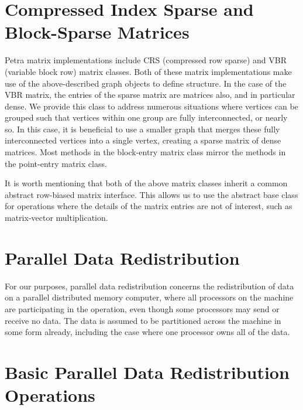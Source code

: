 \documentclass[12pt,relax]{PetraObjectModel}
\begin{document}
\section{Compressed Index Sparse and Block-Sparse Matrices}
Petra matrix implementations include CRS (compressed row sparse) and
VBR (variable block row) matrix classes. Both of these matrix implementations
make use of the above-described graph objects to define structure.
In the case of the VBR matrix, the entries of the sparse
matrix are matrices also, and in particular dense.  We provide this class
to address numerous situations where vertices can be grouped such that
vertices within one group are fully interconnected, or nearly so.  In this
case, it is beneficial to use a smaller graph that merges these fully
interconnected vertices into a single vertex, creating a sparse matrix of
dense matrices.  Most methods in the block-entry matrix class mirror the
methods in the point-entry matrix class.

It is worth mentioning that both of the above matrix classes inherit 
a common abstract row-biased matrix interface.  This allows us to use the
abstract base class for operations where the details of the matrix entries
are not of interest, such as matrix-vector multiplication.



\section{Parallel Data Redistribution}
For our purposes, parallel data redistribution concerns the redistribution of 
data on a parallel distributed memory computer, where all processors on the 
machine are participating in the operation, even though some processors may
send or receive no data.  The data is assumed to be partitioned across the
machine in some form already, including the case where one processor owns all
of the data.


\section{Basic Parallel Data Redistribution Operations}
\end{document}
